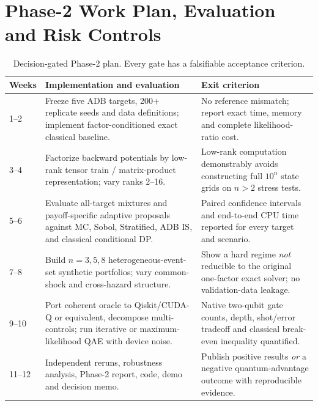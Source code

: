 \documentclass[10pt,conference]{IEEEtran}
\begin{document}
\section{Phase-2 Work Plan, Evaluation and Risk Controls}
\begin{table}[t]
\centering
\caption{Decision-gated Phase-2 plan. Every gate has a falsifiable acceptance criterion.}
\label{tab:plan}
\small
\setlength{\tabcolsep}{7pt}
\begin{tabular}{@{}lp{}p{}@{}}
\toprule
Weeks & Implementation and evaluation & Exit criterion \\
\midrule
1--2 & Freeze five ADB targets, 200+ replicate seeds and data definitions; implement factor-conditioned exact classical baseline. & No reference mismatch; report exact time, memory and complete likelihood-ratio cost. \\
3--4 & Factorize backward potentials by low-rank tensor train / matrix-product representation; vary ranks 2--16. & Low-rank computation demonstrably avoids constructing full $10^n$ state grids on $n>2$ stress tests. \\
5--6 & Evaluate all-target mixtures and payoff-specific adaptive proposals against MC, Sobol, Stratified, ADB IS, and classical conditional DP. & Paired confidence intervals and end-to-end CPU time reported for every target and scenario. \\
7--8 & Build $n=3,5,8$ heterogeneous-event-set synthetic portfolios; vary common-shock and cross-hazard structure. & Show a hard regime \emph{not} reducible to the original one-factor exact solver; no validation-data leakage. \\
9--10 & Port coherent oracle to Qiskit/CUDA-Q or equivalent, decompose multi-controls; run iterative or maximum-likelihood QAE with device noise. & Native two-qubit gate counts, depth, shot/error tradeoff and classical break-even inequality quantified. \\
11--12 & Independent reruns, robustness analysis, Phase-2 report, code, demo and decision memo. & Publish positive results \emph{or} a negative quantum-advantage outcome with reproducible evidence. \\
\bottomrule
\end{tabular}
\end{table}
\end{document}
